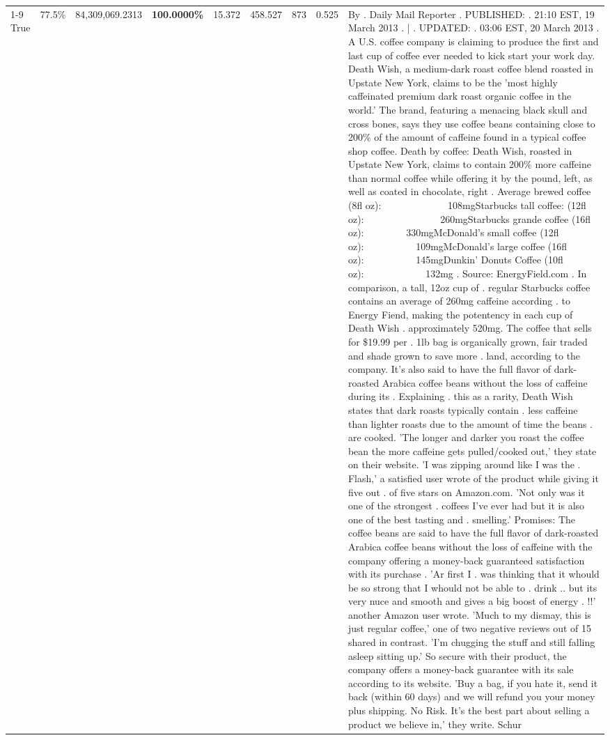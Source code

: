 \begin{table}[H]
{\begin{tabular}{lllrlllll}
\cline{1-9}
True & 77.5\% & 84,309,069.2313 & \bfseries \color{red} 100.0000\% & 15.372 & 458.527 & 873 & 0.525 & By . Daily Mail Reporter . PUBLISHED: . 21:10 EST, 19 March 2013 . | . UPDATED: . 03:06 EST, 20 March 2013 . A U.S. coffee company is claiming to produce the first and last cup of coffee ever needed to kick start your work day. Death Wish, a medium-dark roast coffee blend roasted in Upstate New York, claims to be the 'most highly caffeinated premium dark roast organic coffee in the world.' The brand, featuring a menacing black skull and cross bones, says they use coffee beans containing close to 200\% of the amount of caffeine found in a typical coffee shop coffee. Death by coffee: Death Wish, roasted in Upstate New York, claims to contain 200\% more caffeine than normal coffee while offering it by the pound, left, as well as coated in chocolate, right . Average brewed coffee (8fl oz):              108mgStarbucks tall coffee: (12fl oz):                260mgStarbucks grande coffee (16fl oz):         330mgMcDonald's small coffee (12fl oz):           109mgMcDonald's large coffee (16fl oz):           145mgDunkin' Donuts Coffee (10fl oz):             132mg . Source: EnergyField.com . In comparison, a tall, 12oz cup of . regular Starbucks coffee contains an average of 260mg caffeine according . to Energy Fiend, making the potentency in each cup of Death Wish . approximately 520mg. The coffee that sells for \$19.99 per . 1lb bag is organically grown, fair traded and shade grown to save more . land, according to the company. It's also said to have the full flavor of dark-roasted Arabica coffee beans without the loss of caffeine during its . Explaining . this as a rarity, Death Wish states that dark roasts typically contain . less caffeine than lighter roasts due to the amount of time the beans . are cooked. 'The longer and darker you roast the coffee bean the more caffeine gets pulled/cooked out,' they state on their website. 'I was zipping around like I was the . Flash,' a satisfied user wrote of the product while giving it five out . of five stars on Amazon.com. 'Not only was it one of the strongest . coffees I've ever had but it is also one of the best tasting and . smelling.’ Promises: The coffee beans are said to have the full flavor of dark-roasted Arabica coffee beans without the loss of caffeine with the company offering a money-back guaranteed satisfaction with its purchase . 'Ar first I . was thinking that it whould be so strong that I whould not be able to . drink .. but its very nuce and smooth and gives a big boost of energy . !!' another Amazon user wrote. 'Much to my dismay, this is just regular coffee,' one of two negative reviews out of 15 shared in contrast. 'I'm chugging the stuff and still falling asleep sitting up.' So secure with their product, the company offers a money-back guarantee with its sale according to its website. 'Buy a bag, if you hate it, send it back (within 60 days) and we will refund you your money plus shipping. No Risk. It’s the best part about selling a product we believe in,' they write. Schur \\

\end{tabular}}
\end{table}
